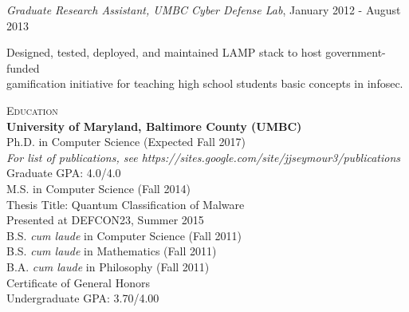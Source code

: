 \btab \textit{Graduate Research Assistant, UMBC Cyber Defense Lab}, January 2012 - August 2013\\
\begin{my_list}
\item Designed, tested, deployed, and maintained LAMP stack to host government-funded\\ \tab \tab gamification initiative for teaching high school students basic concepts in infosec.
\end{my_list}


\medskip
\textsc{Education}\\
\atab \textbf{University of Maryland, Baltimore County (UMBC)}\\
\btab Ph.D. in Computer Science (Expected Fall 2017)\\
\ctab \emph{For list of publications, see https://sites.google.com/site/jjseymour3/publications}\\
\ctab Graduate GPA: 4.0/4.0\\
\btab M.S. in Computer Science (Fall 2014)\\
\ctab Thesis Title: Quantum Classification of Malware\\
\ctab Presented at DEFCON23, Summer 2015\\
\btab B.S. \emph{cum laude} in Computer Science (Fall 2011)\\
\btab B.S. \emph{cum laude} in Mathematics (Fall 2011) \\
\btab B.A. \emph{cum laude} in Philosophy (Fall 2011)\\
\btab Certificate of General Honors\\
\ctab Undergraduate GPA: 3.70/4.00\\

